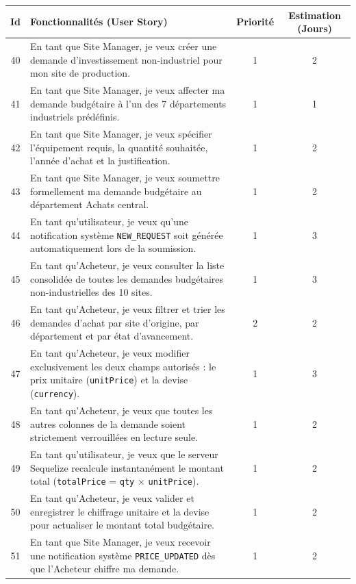 \begin{table}[H]
\centering
\begin{tabular}{|c|p{9.2cm}|c|c|}
\hline
\textbf{Id} & \textbf{Fonctionnalités (User Story)} & \textbf{Priorité} & \textbf{Estimation (Jours)} \\ \hline
40 & En tant que Site Manager, je veux créer une demande d'investissement non-industriel pour mon site de production. & 1 & 2 \\ \hline
41 & En tant que Site Manager, je veux affecter ma demande budgétaire à l'un des 7 départements industriels prédéfinis. & 1 & 1 \\ \hline
42 & En tant que Site Manager, je veux spécifier l'équipement requis, la quantité souhaitée, l'année d'achat et la justification. & 1 & 2 \\ \hline
43 & En tant que Site Manager, je veux soumettre formellement ma demande budgétaire au département Achats central. & 1 & 2 \\ \hline
44 & En tant qu'utilisateur, je veux qu'une notification système \texttt{NEW\_REQUEST} soit générée automatiquement lors de la soumission. & 1 & 3 \\ \hline
45 & En tant qu'Acheteur, je veux consulter la liste consolidée de toutes les demandes budgétaires non-industrielles des 10 sites. & 1 & 3 \\ \hline
46 & En tant qu'Acheteur, je veux filtrer et trier les demandes d'achat par site d'origine, par département et par état d'avancement. & 2 & 2 \\ \hline
47 & En tant qu'Acheteur, je veux modifier exclusivement les deux champs autorisés : le prix unitaire (\texttt{unitPrice}) et la devise (\texttt{currency}). & 1 & 3 \\ \hline
48 & En tant qu'Acheteur, je veux que toutes les autres colonnes de la demande soient strictement verrouillées en lecture seule. & 1 & 2 \\ \hline
49 & En tant qu'utilisateur, je veux que le serveur Sequelize recalcule instantanément le montant total (\texttt{totalPrice} = \texttt{qty} $\times$ \texttt{unitPrice}). & 1 & 2 \\ \hline
50 & En tant qu'Acheteur, je veux valider et enregistrer le chiffrage unitaire et la devise pour actualiser le montant total budgétaire. & 1 & 2 \\ \hline
51 & En tant que Site Manager, je veux recevoir une notification système \texttt{PRICE\_UPDATED} dès que l'Acheteur chiffre ma demande. & 1 & 2 \\ \hline

\end{tabular}
\end{table}
